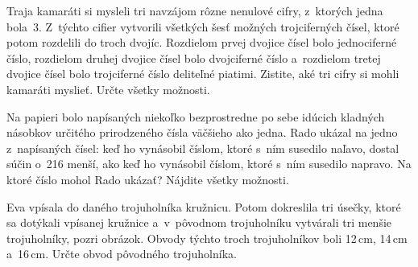 {%
Traja kamaráti si mysleli tri navzájom rôzne nenulové cifry, z~ktorých jedna bola~3.
Z~týchto cifier vytvorili všetkých šesť možných trojciferných čísel, ktoré potom rozdelili do troch dvojíc.
Rozdielom prvej dvojice čísel bolo jednociferné číslo, rozdielom druhej dvojice čísel bolo dvojciferné číslo a~rozdielom tretej dvojice čísel bolo trojciferné číslo deliteľné piatimi. Zistite, aké tri cifry si mohli kamaráti myslieť. Určte všetky možnosti.}

{%
Na papieri bolo napísaných niekoľko bezprostredne po sebe idúcich kladných násobkov určitého prirodzeného čísla väčšieho ako jedna.
Rado ukázal na jedno z~napísaných čísel: keď ho vynásobil číslom, ktoré s~ním susedilo naľavo, dostal súčin o~216 menší, ako keď ho vynásobil číslom, ktoré s~ním susedilo napravo. Na ktoré číslo mohol Rado ukázať? Nájdite všetky možnosti.
}

{%
Eva vpísala do daného trojuholníka kružnicu.
Potom dokreslila tri úsečky, ktoré sa dotýkali vpísanej kružnice a~v~pôvodnom trojuholníku vytvárali tri menšie trojuholníky, pozri obrázok.
Obvody týchto troch trojuholníkov boli 12\,cm, 14\,cm a~16\,cm. Určte obvod pôvodného trojuholníka.
\ifobrazkyvedla\else{}\fi
}

